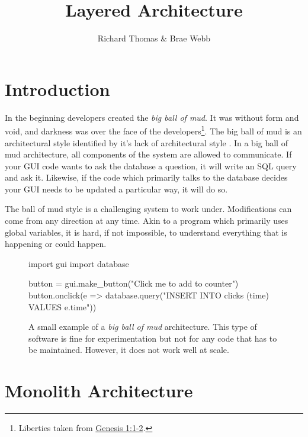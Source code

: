 \title{Layered Architecture}
\author{Richard Thomas \& Brae Webb}
\date{}

\maketitle

\section{Introduction}
In the beginning developers created the \textit{big ball of mud}.
It was without form and void, and darkness was over the face of the developers\footnote{Liberties taken from
\href{https://www.biblegateway.com/passage/?search=gen+1\&version=ESV}{Genesis 1:1-2}.}.
The big ball of mud is an architectural style identified by it's lack of architectural style \cite{ballofmud}.
In a big ball of mud architecture, all components of the system are allowed to communicate.
If your GUI code wants to ask the database a question, it will write an SQL query and ask it.
Likewise, if the code which primarily talks to the database decides your GUI needs to be updated a particular way, it will do so.

The ball of mud style is a challenging system to work under.
Modifications can come from any direction at any time.
Akin to a program which primarily uses global variables,
it is hard, if not impossible,
to understand everything that is happening or could happen.


\begin{figure}[ht]
\begin{code}[style=python]{}
import gui
import database

button = gui.make_button("Click me to add to counter")
button.onclick(e => 
    database.query("INSERT INTO clicks (time) VALUES {{e.time}}"))
\end{code}
\caption{
A small example of a \textsl{big ball of mud} architecture.
This type of software is fine for experimentation
but not for any code that has to be maintained.
However, it does not work well at scale.
}
\end{figure}

\section{Monolith Architecture}

